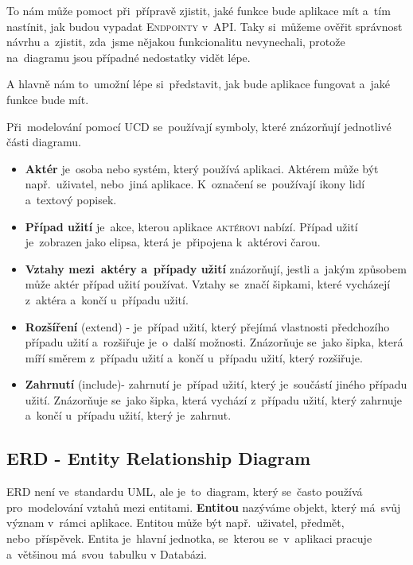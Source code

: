 \documentclass[14pt,a4paper]{article}
\begin{document}
        To nám může pomoct při~přípravě zjistit, jaké funkce bude aplikace mít a~tím nastínit, jak budou vypadat \textsc{Endpointy} v~\textsc{API}.
        Taky si~můžeme ověřit správnost návrhu a~zjistit, zda~jsme nějakou funkcionalitu nevynechali, protože na~diagramu jsou případné nedostatky vidět lépe.
        
        A hlavně nám to~umožní lépe si~představit, jak bude aplikace fungovat a~jaké funkce bude mít. \parencite{uml:usecase}

        Při~modelování pomocí \textsc{UCD} se~používají symboly, které znázorňují jednotlivé části diagramu.
        \begin{itemize}
            \item \textbf{Aktér} je~osoba nebo systém, který používá aplikaci. Aktérem může být např.~uživatel, nebo~jiná aplikace. K~označení se~používají ikony lidí a~textový popisek.
            \item \textbf{Případ užití} je~akce, kterou aplikace \textsc{aktérovi} nabízí. Případ užití je~zobrazen jako elipsa, která je~připojena k~aktérovi čarou.
            \item \textbf{Vztahy mezi~aktéry a~případy užití} znázorňují, jestli a~jakým způsobem může aktér případ užití používat. Vztahy se~značí šipkami, které vycházejí z~aktéra a~končí u~případu užití.
            \item \textbf{Rozšíření} (extend) - je~případ užití, který přejímá vlastnosti předchozího případu užití a~rozšiřuje je~o~další možnosti. Znázorňuje se~jako šipka, která míří směrem z~případu užití a~končí u~případu užití, který rozšiřuje.
            \item \textbf{Zahrnutí} (include)- zahrnutí je~případ užití, který je~součástí jiného případu užití. Znázorňuje se~jako šipka, která vychází z~případu užití, který zahrnuje a~končí u~případu užití, který je~zahrnut.
        \end{itemize}

        \subsection{ERD - Entity Relationship Diagram}
        \textsc{ERD} není ve~standardu \textsc{UML}, ale je~to~diagram, který se~často používá pro~modelování vztahů mezi entitami.
        \textbf{Entitou} nazýváme objekt, který má~svůj význam v~rámci aplikace. Entitou může být např.~uživatel, předmět, nebo~příspěvek.
        Entita je~hlavní jednotka, se~kterou se~v~aplikaci pracuje a~většinou má~svou~tabulku v Databázi.
\end{document}
